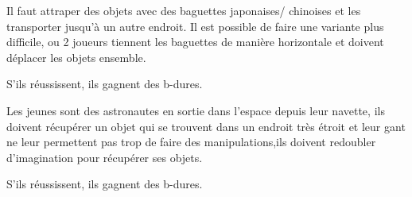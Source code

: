 \documentclass{grand-jeu}
\begin{document}
\begin{liste-materiel}
\end{liste-materiel}

\begin{regles}
Il faut attraper des objets avec des baguettes japonaises/ chinoises et les transporter jusqu’à un autre endroit. Il est possible de faire une variante plus difficile, ou 2 joueurs tiennent les baguettes de manière horizontale et doivent déplacer les objets ensemble.

S’ils réussissent, ils gagnent des b-dures.
\end{regles}

\begin{imaginaire}
Les jeunes sont des astronautes en sortie dans l’espace depuis leur navette, ils doivent récupérer un objet qui se trouvent dans un endroit très étroit et leur gant ne leur permettent pas trop de faire des manipulations,ils doivent redoubler d'imagination pour récupérer ses objets.

S'ils réussissent, ils gagnent des b-dures.
\end{imaginaire}

\begin{moments-stop}
\end{moments-stop}
\end{document}
